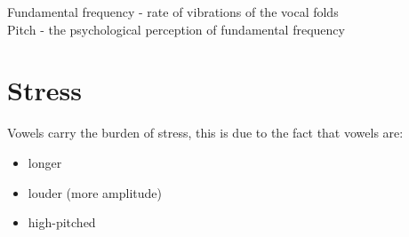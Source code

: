 \documentclass[title={}]{com310notes}
\begin{document}
\maketitle

Fundamental frequency - rate of vibrations of the vocal folds\\

Pitch - the psychological perception of fundamental frequency

\section{Stress}\label{sec:stress}
Vowels carry the burden of stress, this is due to the fact that vowels are:
\begin{itemize}
	\item longer
	\item louder (more amplitude)
	\item high-pitched
\end{itemize}
\end{document}
